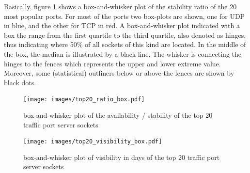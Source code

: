 Basically, figure \ref{fig:top20_ratio_box} shows a box-and-whisker plot of the stability ratio of the 20 most popular ports. 
For most of the ports two box-plots are shown, one for \gls{UDP} in blue, and the other for \gls{TCP} in red. 
A box-and-whisker plot indicated with a box the range from the first quartile to the third quartile, also denoted as hinges, thus indicating where 50\% of all sockets of this kind are located. 
In the middle of the box, the median is illustrated by a black line. 
The whisker is connecting the hinges to the fences which represents the upper and lower extreme value. 
Moreover, some (statistical) outliners below or above the fences are shown by black dots. 
\begin{landscape}
	\begin{figure}
		[p] \centering 
		\texttt{[image: images/top20\_ratio\_box.pdf]} \caption{box-and-whisker plot of the availability / stability of the top 20 traffic port server sockets} 
		\label{fig:top20_ratio_box} 
	\end{figure}
\end{landscape}
\begin{landscape}
	\begin{figure}
		[p] \centering 
		\texttt{[image: images/top20\_visibility\_box.pdf]} \caption{box-and-whisker plot of visibility in days of the top 20 traffic port server sockets} 
		\label{fig:top20_visibledays_box} 
	\end{figure}
\end{landscape}

